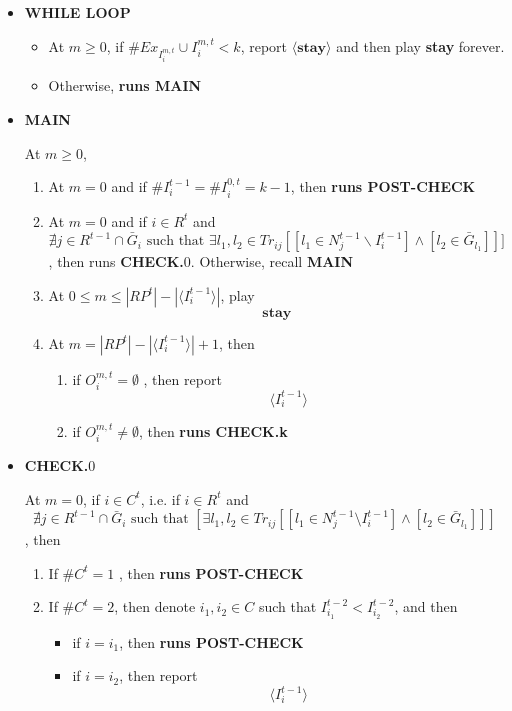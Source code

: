 \documentclass[12pt,letter]{article}
\theoremstyle{definition}
\theoremstyle{remark}
\theoremstyle{claim}
\begin{document}
\begin{itemize}

\item \textbf{WHILE LOOP}
\begin{itemize}
\item At $m\geq 0$, if $\# Ex_{I^{m,t}_i}\cup I^{m,t}_i< k$, report $\langle \textbf{stay} \rangle$ and then play \textbf{stay} forever.
\item Otherwise, \textbf{runs MAIN }
\end{itemize}


\item \textbf{MAIN}

At $m\geq 0$, 

\begin{enumerate}
\item At $m=0$ and if $\# I^{t-1}_i=\# I^{0,t}_i= k-1$, then 
\textbf{runs POST-CHECK }


\item At $m=0$ and if $i\in R^t$ and
\[\nexists j\in R^{t-1}\cap\bar{G}_i \text{ such that }\exists l_1,l_2\in Tr_{ij}[[l_1\in N^{t-1}_j\backslash I^{t-1}_i] \wedge [l_2\in \bar{G}_{l_1}]]]\]
, then runs \textbf{CHECK.$0$}. Otherwise, recall \textbf{MAIN}
\item At $0\leq m \leq |RP^t|-|\langle I^{t-1}_i \rangle|$, play
\[\textbf{stay}\]
\item At $m = |RP^t|-|\langle I^{t-1}_i \rangle|+1$, then
\begin{enumerate}
\item if $O^{m,t}_i= \emptyset$ 
, then report
\[\langle I^{t-1}_i \rangle\]
\item if $O^{m,t}_i\neq \emptyset$, then \textbf{runs CHECK.k}

\end{enumerate}

\end{enumerate}





\item \textbf{CHECK.$0$}

At $m=0$, if $i\in C^t$, i.e. if $i\in R^t$ and
\[\nexists j\in R^{t-1}\cap \bar{G}_i \text{ such that }[\exists l_1,l_2\in Tr_{ij}[[l_1\in N^{t-1}_j\setminus I^{t-1}_i] \wedge [l_2\in \bar{G}_{l_1}]]]\]
, then
\begin{enumerate}
\item If $\#C^t=1$
, then 
\textbf{runs POST-CHECK }

\item If $\#C^t=2$, then denote $i_1,i_2\in C$ such that $I^{t-2}_{i_1}<I^{t-2}_{i_2}$, and then
\begin{itemize}
\item if $i=i_1$, then 
\textbf{runs POST-CHECK }
\item if $i=i_2$, then report
\[\langle I^{t-1}_i \rangle\]


\end{itemize}
\end{enumerate}
\end{itemize}
\end{document}
